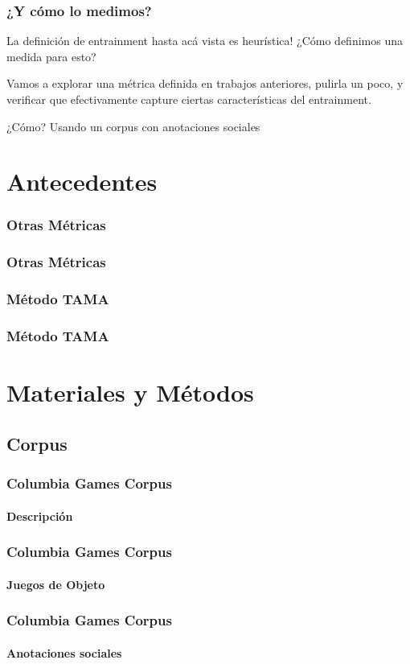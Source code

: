 \documentclass{beamer}
\begin{document}
\begin{frame}
  \frametitle{¿Y cómo lo medimos?}
  La definición de entrainment hasta acá vista es heurística! ¿Cómo definimos una medida para esto?

  Vamos a explorar una métrica definida en trabajos anteriores, pulirla un poco, y verificar que efectivamente capture ciertas características del entrainment.

  ¿Cómo? Usando un corpus con anotaciones sociales


\end{frame}


\section{Antecedentes}

\begin{frame}
  \frametitle{Otras Métricas}
\end{frame}

\begin{frame}
  \frametitle{Otras Métricas}
  \subtitle{Problemas}
\end{frame}



\begin{frame}
  \frametitle{Método TAMA}
\end{frame}


\begin{frame}
  \frametitle{Método TAMA}
  \subtitle{Ventajas}
\end{frame}


\section{Materiales y Métodos}

\subsection{Corpus}
\begin{frame}
  \frametitle{Columbia Games Corpus}
  \framesubtitle{Descripción}

\end{frame}


\begin{frame}
  \frametitle{Columbia Games Corpus}
  \framesubtitle{Juegos de Objeto}

\end{frame}


\begin{frame}
  \frametitle{Columbia Games Corpus}
  \framesubtitle{Anotaciones sociales}

\end{frame}
\end{document}
